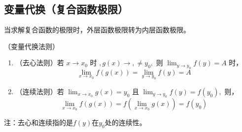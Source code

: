 \subsection{变量代换（复合函数极限）}
当求解复合函数的极限时，外层函数极限转为内层函数极限。
\begin{theorem}
    \label{th:变量代换法则}
    （变量代换法则）
    \begin{enumerate}
        \item （去心法则）$\text{若~} x \to x_0\text{ 时~}, g(x)\to,\neq y_0, \text{ 则~}\lim_{y\to y_0}f(y)=A\text{ 时，}$
              \[ \lim_{x\to x_0} f(g(x)) = \lim_{y\to y_0} f(y) = A \]
        \item （连续法则）$\text{若~} \lim_{x\to x_0} g(x) = y_0 \text{ 且~} \lim_{y\to y_0} f(y) = f(y_0), \text{ 则，}$
              \[ \lim_{x\to x_0} f(g(x)) = f(\lim_{x\to x_0} g(x)) = f(y_0) \]
    \end{enumerate}
    注：去心和连续指的是$f(y)$在$y_0$处的连续性。
\end{theorem}

